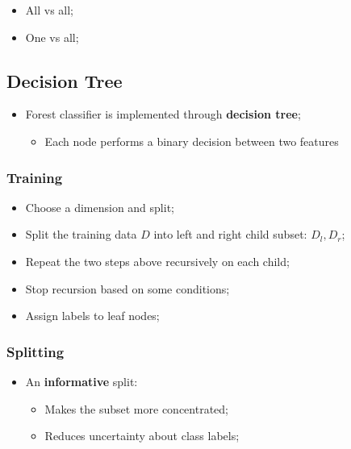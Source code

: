       \begin{itemize}
        \item All vs all;
        \item One vs all;
      \end{itemize}
      
  \subsection{Decision Tree}
  
    \begin{itemize}
      \item Forest classifier is implemented through \textbf{decision tree};
      \begin{itemize}
        \item Each node performs a binary decision between two features
      \end{itemize}
    \end{itemize}
    
    \subsubsection{Training}
    
      \begin{itemize}
        \item Choose a dimension and split;
        \item Split the training data $ D $ into left and right child subset: $ D_{l}, D_{r} $;
        \item Repeat the two steps above recursively on each child;
        \item Stop recursion based on some conditions;
        \item Assign labels to leaf nodes;
      \end{itemize}
      
    \subsubsection{Splitting}
    
      \begin{itemize}
        \item An \textbf{informative} split:
        \begin{itemize}
          \item Makes the subset more concentrated;
          \item Reduces uncertainty about class labels;
        \end{itemize}
      \end{itemize}
      
